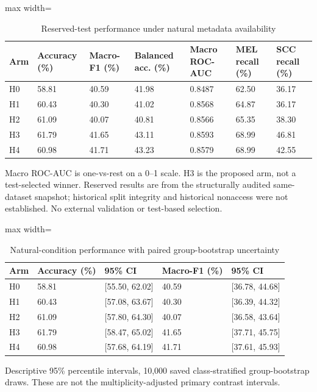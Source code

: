 \begin{table}[t]
\centering
\small
\caption{Reserved-test performance under natural metadata availability}
\label{tab:05-reserved-natural-performance}
\begin{adjustbox}{max width=\textwidth}
\begin{tabular}{lllllll}
\toprule
\textbf{Arm} & \textbf{Accuracy (\%)} & \textbf{Macro-F1 (\%)} & \textbf{Balanced acc. (\%)} & \textbf{Macro ROC-AUC} & \textbf{MEL recall (\%)} & \textbf{SCC recall (\%)} \\
\midrule
H0 & 58.81 & 40.59 & 41.98 & 0.8487 & 62.50 & 36.17 \\
H1 & 60.43 & 40.30 & 41.02 & 0.8568 & 64.87 & 36.17 \\
H2 & 61.09 & 40.07 & 40.81 & 0.8566 & 65.35 & 38.30 \\
H3 & 61.79 & 41.65 & 43.11 & 0.8593 & 68.99 & 46.81 \\
H4 & 60.98 & 41.71 & 43.23 & 0.8579 & 68.99 & 42.55 \\
\bottomrule
\end{tabular}
\end{adjustbox}
\par\smallskip
\begin{minipage}{\textwidth}\footnotesize Macro ROC-AUC is one-vs-rest on a 0--1 scale. H3 is the proposed arm, not a test-selected winner. Reserved results are from the structurally audited same-dataset snapshot; historical split integrity and historical nonaccess were not established. No external validation or test-based selection.\end{minipage}
\end{table}

\begin{table}[t]
\centering
\small
\caption{Natural-condition performance with paired group-bootstrap uncertainty}
\label{tab:06-reserved-uncertainty}
\begin{adjustbox}{max width=\textwidth}
\begin{tabular}{lllll}
\toprule
\textbf{Arm} & \textbf{Accuracy (\%)} & \textbf{95\% CI} & \textbf{Macro-F1 (\%)} & \textbf{95\% CI} \\
\midrule
H0 & 58.81 & [55.50, 62.02] & 40.59 & [36.78, 44.68] \\
H1 & 60.43 & [57.08, 63.67] & 40.30 & [36.39, 44.32] \\
H2 & 61.09 & [57.80, 64.30] & 40.07 & [36.58, 43.64] \\
H3 & 61.79 & [58.47, 65.02] & 41.65 & [37.71, 45.75] \\
H4 & 60.98 & [57.68, 64.19] & 41.71 & [37.61, 45.93] \\
\bottomrule
\end{tabular}
\end{adjustbox}
\par\smallskip
\begin{minipage}{\textwidth}\footnotesize Descriptive 95\% percentile intervals, 10,000 saved class-stratified group-bootstrap draws. These are not the multiplicity-adjusted primary contrast intervals.\end{minipage}
\end{table}

